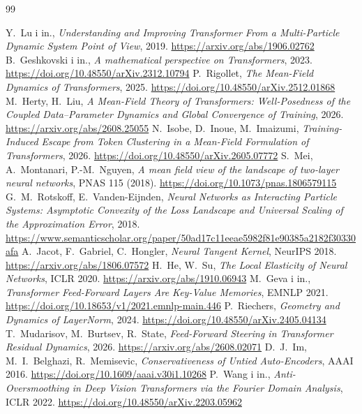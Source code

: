 \documentclass[a4paper,11pt]{article}
\newcounter{pn}
\begin{document}
\begin{thebibliography}{99}\small
{}
 Y.~Lu i in., \emph{Understanding and Improving Transformer From a Multi-Particle Dynamic System Point of View}, 2019. \url{https://arxiv.org/abs/1906.02762}
 B.~Geshkovski i in., \emph{A mathematical perspective on Transformers}, 2023. \url{https://doi.org/10.48550/arXiv.2312.10794}
 P.~Rigollet, \emph{The Mean-Field Dynamics of Transformers}, 2025. \url{https://doi.org/10.48550/arXiv.2512.01868}
 M.~Herty, H.~Liu, \emph{A Mean-Field Theory of Transformers: Well-Posedness of the Coupled Data--Parameter Dynamics and Global Convergence of Training}, 2026. \url{https://arxiv.org/abs/2608.25055}
 N.~Isobe, D.~Inoue, M.~Imaizumi, \emph{Training-Induced Escape from Token Clustering in a Mean-Field Formulation of Transformers}, 2026. \url{https://doi.org/10.48550/arXiv.2605.07772}
 S.~Mei, A.~Montanari, P.-M.~Nguyen, \emph{A mean field view of the landscape of two-layer neural networks}, PNAS 115 (2018). \url{https://doi.org/10.1073/pnas.1806579115}
 G.~M.~Rotskoff, E.~Vanden-Eijnden, \emph{Neural Networks as Interacting Particle Systems: Asymptotic Convexity of the Loss Landscape and Universal Scaling of the Approximation Error}, 2018. \url{https://www.semanticscholar.org/paper/50ad17c11eeae5982f81e90385a2182f30330afa}
 A.~Jacot, F.~Gabriel, C.~Hongler, \emph{Neural Tangent Kernel}, NeurIPS 2018. \url{https://arxiv.org/abs/1806.07572}
 H.~He, W.~Su, \emph{The Local Elasticity of Neural Networks}, ICLR 2020. \url{https://arxiv.org/abs/1910.06943}
 M.~Geva i in., \emph{Transformer Feed-Forward Layers Are Key-Value Memories}, EMNLP 2021. \url{https://doi.org/10.18653/v1/2021.emnlp-main.446}
 P.~Riechers, \emph{Geometry and Dynamics of LayerNorm}, 2024. \url{https://doi.org/10.48550/arXiv.2405.04134}
 T.~Mudarisov, M.~Burtsev, R.~State, \emph{Feed-Forward Steering in Transformer Residual Dynamics}, 2026. \url{https://arxiv.org/abs/2608.02071}
 D.~J.~Im, M.~I.~Belghazi, R.~Memisevic, \emph{Conservativeness of Untied Auto-Encoders}, AAAI 2016. \url{https://doi.org/10.1609/aaai.v30i1.10268}
 P.~Wang i in., \emph{Anti-Oversmoothing in Deep Vision Transformers via the Fourier Domain Analysis}, ICLR 2022. \url{https://doi.org/10.48550/arXiv.2203.05962}

\end{thebibliography}
\end{document}
